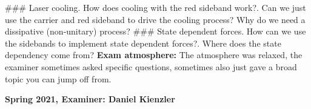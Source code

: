 \documentclass{article}%
\begin{document}
\begin{enumerate}
\begin{mycolorbox}
\newline%
\#\#\# Laser cooling. How does cooling with the red sideband work?. Can we just use the carrier and red sideband to drive the cooling process? Why do we need a dissipative (non{-}unitary) process?\newline%
\newline%
\#\#\# State dependent forces. How can we use the sidebands to implement state dependent forces?. Where does the state dependency come from?%
\newline%
\newline%
\textbf{Exam atmosphere:}%
\newline%
The atmosphere was relaxed, the examiner sometimes asked specific questions, sometimes also just gave a broad topic you can jump off from.%
\end{mycolorbox}%
\end{enumerate}%
\newpage%
\begin{center}%
\begin{large}%
\textbf{Spring 2021, Examiner: Daniel Kienzler}%
\end{large}%
\end{center}%
\end{document}
